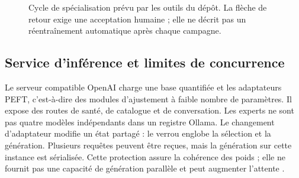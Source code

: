 \documentclass[11pt,a4paper]{article}
\begin{document}
\begin{figure}[htbp]
\centering
{}
\caption{Cycle de spécialisation prévu par les outils du dépôt. La flèche de
retour exige une acceptation humaine ; elle ne décrit pas un réentraînement
automatique après chaque campagne.}
\label{fig:ml-cycle}
\end{figure}

\subsection{Service d'inférence et limites de concurrence}

Le serveur compatible OpenAI charge une base quantifiée et les adaptateurs
PEFT, c'est-à-dire des modules d'ajustement à faible nombre de paramètres. Il
expose des routes de santé, de catalogue et de conversation. Les experts ne
sont pas quatre modèles indépendants dans un registre Ollama. Le changement
d'adaptateur modifie un état partagé : le verrou englobe la sélection et la
génération. Plusieurs requêtes peuvent être reçues, mais la génération sur
cette instance est sérialisée. Cette protection assure la cohérence des poids ;
elle ne fournit pas une capacité de génération parallèle et peut augmenter
l'attente \cite{ml-server,ml-service}.
\end{document}
